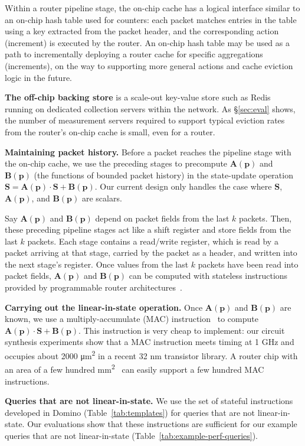 Within a router pipeline stage, the on-chip cache has a logical interface
similar to an on-chip hash table used for counters: each packet matches entries
in the table using a key extracted from the packet header, and the
corresponding action (\ie increment) is executed by the router. An on-chip hash
table may be used as a path to incrementally deploying a router cache for
specific aggregations (\eg increments), on the way to supporting more general
actions and cache eviction logic in the future.

\textbf{The off-chip backing store} is a scale-out key-value store such as
Redis~\cite{redis} running on dedicated collection servers within the network.
As \S\ref{sec:eval} shows, the number of measurement servers required to
support typical eviction rates from the router's on-chip cache is small, even
for a \hundredgrouter router.

\textbf{Maintaining packet history.} Before a packet reaches the pipeline stage
with the on-chip cache, we use the preceding stages to precompute
$\boldsymbol{A}(\mathbf{p})$ and $\boldsymbol{B}(\mathbf{p})$ (the functions of bounded packet history)
in the state-update operation $\boldsymbol{S} =\boldsymbol{A}(\mathbf{p}) \cdot
\boldsymbol{S} + \boldsymbol{B}(\mathbf{p})$.
Our current design only handles the case
where $\boldsymbol{S}$, $\boldsymbol{A}(\mathbf{p})$, and $\boldsymbol{B}(\mathbf{p})$ are scalars.

Say $\boldsymbol{A}(\mathbf{p})$ and $\boldsymbol{B}(\mathbf{p})$ depend on
packet fields from the last $k$ packets. Then, these preceding pipeline stages
act like a shift register and store fields from the last $k$ packets. Each
stage contains a read/write register, which is read by a packet arriving at
that stage, carried by the packet as a header, and written into the next
stage's register. Once values from the last $k$ packets have been read into
packet fields, $\boldsymbol{A}(\mathbf{p})$ and $\boldsymbol{B}(\mathbf{p})$
can be computed with stateless instructions provided by programmable router
architectures~\cite{rmt, domino_sigcomm}.

\textbf{Carrying out the linear-in-state operation.} Once
$\boldsymbol{A}(\mathbf{p})$ and $\boldsymbol{B}(\mathbf{p})$ are known, we use
a multiply-accumulate (MAC) instruction~\cite{mac} to compute
$\boldsymbol{A}(\mathbf{p}) \cdot \boldsymbol{S} + \boldsymbol{B}(\mathbf{p})$.
This instruction is very cheap to implement: our circuit synthesis experiments
show that a MAC instruction meets timing at 1 GHz and occupies about 2000
\si{\micro\metre\squared} in a recent 32 nm transistor library. A router chip
with an area of a few hundred \si{\milli\meter\squared}~\cite{glen_parsing} can
easily support a few hundred MAC instructions.

\textbf{Queries that are not linear-in-state.} We use the set of stateful
instructions developed in Domino (Table~\ref{tab:templates}) for queries that
are not linear-in-state. Our evaluations show that these instructions are
sufficient for our example queries that are not linear-in-state
(Table~\ref{tab:example-perf-queries}).
